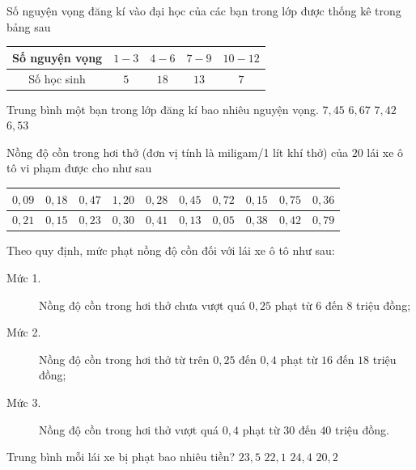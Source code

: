 \begin{ex}%
	Số nguyện vọng đăng kí vào đại học của các bạn trong lớp được thống kê trong bảng sau
	\begin{center}
		\begin{longtable}{|c|c|c|c|c|}
			\hline
			Số nguyện vọng & $1-3$ & $4-6$ & $7-9$ & $10-12$\\
			\hline
			Số học sinh & $5$ & $18$ & $13$ & $7$\\
			\hline
		\end{longtable}
	\end{center}
	Trung bình một bạn trong lớp đăng kí bao nhiêu nguyện vọng.
	\choice 
	{$7{,}45$}
	{$6{,}67$}
	{$7{,}42$}
	{\True $6{,}53$}	
\end{ex}

\begin{ex}%
	Nồng độ cồn trong hơi thở (đơn vị tính là miligam/1 lít khí thở) của $20$ lái xe ô tô vi phạm được cho như sau
	\begin{center}
		\begin{longtable}{|c|c|c|c|c|c|c|c|c|c|}
			\hline
			$0{,}09$ & $0{,}18$ & $0{,}47$ & $1{,}20$ & $0{,}28$ & $0{,}45$ & $0{,}72$ & $0{,}15$ & $0{,}75$ & $0{,}36$\\
			\hline
			$0{,}21$ & $0{,}15$ & $0{,}23$ & $0{,}30$ & $0{,}41$ & $0{,}13$ & $0{,}05$ & $0{,}38$ & $0{,}42$ & $0{,}79$\\
			\hline
		\end{longtable}
	\end{center}
Theo quy định, mức phạt nồng độ cồn đối với lái xe ô tô như sau:
\begin{description}
	\item[Mức 1.] Nồng độ cồn trong hơi thở chưa vượt quá $0{,}25$ phạt từ $6$ đến $8$ triệu đồng;
	\item[Mức 2.] Nồng độ cồn trong hơi thở từ trên $0{,}25$ đến $0{,}4$ phạt từ $16$ đến $18$ triệu đồng;
	\item[Mức 3.] Nồng độ cồn trong hơi thở vượt quá $0{,}4$ phạt từ $30$ đến $40$ triệu đồng.
\end{description}
	Trung bình mỗi lái xe bị phạt bao nhiêu tiền?
	\choice 
	{$23{,}5$}
	{$22{,}1$}
	{$24{,}4$}
	{\True $20{,}2$}		
\end{ex}

